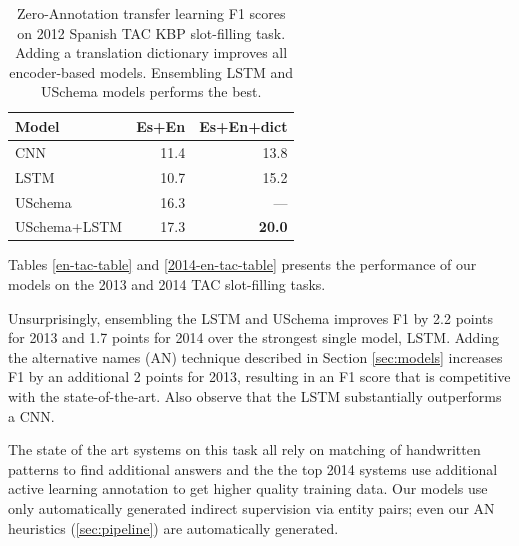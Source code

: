 \begin{table}[h!]

\begin{center}
\begin{tabular}{|lrr|}
\hline
\bf Model & \bf Es+En & \bf Es+En+dict  \\
\hline\hline
CNN 		                    & 11.4     & 13.8	\\
LSTM 	                        & 10.7     & 15.2   \\
USchema                         & 16.3     & --- \\
\hline
USchema+LSTM                    & 17.3     & \bf 20.0 \\
\hline
\end{tabular}
\caption{Zero-Annotation transfer learning F1 scores on 2012 Spanish TAC KBP slot-filling task. Adding a translation dictionary improves all encoder-based models. Ensembling LSTM and USchema models performs the best. \label{es-tac-table}}
\end{center}
\end{table}




Tables \ref{en-tac-table} and \ref{2014-en-tac-table} presents the performance of our models on the 2013 and 2014 TAC slot-filling tasks.

Unsurprisingly, ensembling the LSTM and USchema improves F1 by 2.2 points for 2013 and 1.7 points for 2014 over the strongest single model, LSTM. Adding the alternative names (AN) technique described in Section \ref{sec:models} increases F1 by an additional 2 points for 2013, resulting in an F1 score that is competitive with the state-of-the-art. Also observe that the LSTM substantially outperforms a CNN.

The state of the art systems on this task all rely on matching of handwritten patterns to find additional answers and the the top 2014 systems use additional active learning annotation to get higher quality training data. Our models use only automatically generated indirect supervision via entity pairs; even our AN heuristics (\ref{sec:pipeline}) are automatically generated.

